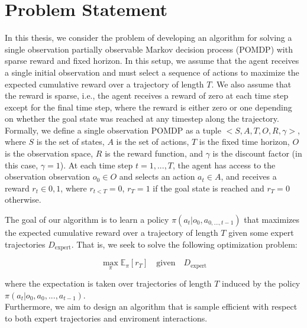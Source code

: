 \chapter{Problem Statement}
\label{chapter:Problem}
In this thesis, we consider the problem of developing an algorithm for solving a single observation partially observable Markov decision process (POMDP) with sparse reward and fixed horizon. 
In this setup, we assume that the agent receives a single initial observation and must select a sequence of actions to maximize the expected cumulative reward over a trajectory of length $T$. 
We also assume that the reward is sparse, i.e., the agent receives a reward of zero at each time step except for the final time step, where the reward is either zero or one depending on whether the 
goal state was reached at any timestep along the trajectory.\\

Formally, we define a single observation POMDP as a tuple $<S,A,T,O,R,\gamma>$, where $S$ is the set of states, $A$ is the set of actions, $T$ is the fixed 
time horizon, $O$ is the observation space, $R$ is the reward function, and $\gamma$ is the discount factor (in this case, $\gamma=1$). 
At each time step $t=1,...,T$, the agent has access to the observation observation $o_0\in O$ and selects an action $a_t\in A$, and receives a 
reward $r_t\in {0,1}$, where $r_{t<T} = 0$, $r_T=1$ if the goal state is reached and $r_T=0$ otherwise.

The goal of our algorithm is to learn a policy $\pi(a_t|o_0, a_{0,...,t-1})$ that maximizes the expected cumulative reward over a trajectory of length $T$ given 
some expert trajectories $D_{\text{expert}}$. 
That is, we seek to solve the following optimization problem:

\begin{equation}
\max_{\pi} \mathbb{E}_{\pi}[r_T]\quad \text{given}\quad D_{\text{expert}}
\end{equation}

where the expectation is taken over trajectories of length $T$ induced by the policy\\ $\pi(a_t|o_0, a_0, ..., a_{t-1})$.\\

Furthermore, we aim to design an algorithm that is sample efficient with respect to both expert trajectories and enviroment interactions. 


